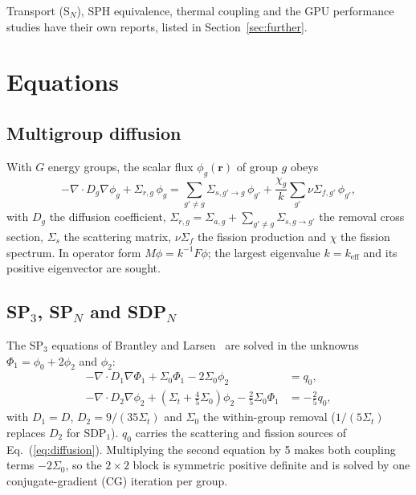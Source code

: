 \documentclass[a4paper,10pt]{article}
\begin{document}
Transport (S$_N$), SPH equivalence, thermal coupling and the GPU performance
studies have their own reports, listed in Section~\ref{sec:further}.

\tableofcontents

\section{Equations}
\label{sec:equations}

\subsection{Multigroup diffusion}

With $G$ energy groups, the scalar flux $\phi_g(\mathbf r)$ of group $g$ obeys
\begin{equation}
-\nabla\cdot D_g\nabla\phi_g + \Sigma_{r,g}\,\phi_g
  = \sum_{g'\neq g}\Sigma_{s,g'\to g}\,\phi_{g'}
  + \frac{\chi_g}{k}\sum_{g'}\nu\Sigma_{f,g'}\,\phi_{g'},
\label{eq:diffusion}
\end{equation}
with $D_g$ the diffusion coefficient, $\Sigma_{r,g} = \Sigma_{a,g} +
\sum_{g'\neq g}\Sigma_{s,g\to g'}$ the removal cross section, $\Sigma_{s}$ the
scattering matrix, $\nu\Sigma_f$ the fission production and $\chi$ the fission
spectrum. In operator form $M\phi = k^{-1}F\phi$; the largest eigenvalue $k =
k_\mathrm{eff}$ and its positive eigenvector are sought.

\subsection{\texorpdfstring{SP$_3$, SP$_N$ and SDP$_N$}{SP3, SPN and SDPN}}

The SP$_3$ equations of Brantley and Larsen~\cite{brantley2000} are solved in
the unknowns $\Phi_1 = \phi_0 + 2\phi_2$ and $\phi_2$:
\begin{align}
-\nabla\cdot D_1\nabla\Phi_1 + \Sigma_0\Phi_1 - 2\Sigma_0\phi_2 &= q_0,\\
-\nabla\cdot D_2\nabla\phi_2 + \left(\Sigma_t + \tfrac45\Sigma_0\right)\phi_2
  - \tfrac25\Sigma_0\Phi_1 &= -\tfrac25 q_0,
\end{align}
with $D_1 = D$, $D_2 = 9/(35\Sigma_t)$ and $\Sigma_0$ the within-group removal
($1/(5\Sigma_t)$ replaces $D_2$ for SDP$_1$). $q_0$ carries the scattering and
fission sources of Eq.~(\ref{eq:diffusion}). Multiplying the second equation by
5 makes both coupling terms $-2\Sigma_0$, so the $2\times2$ block is symmetric
positive definite and is solved by one conjugate-gradient (CG) iteration per group.
\end{document}
